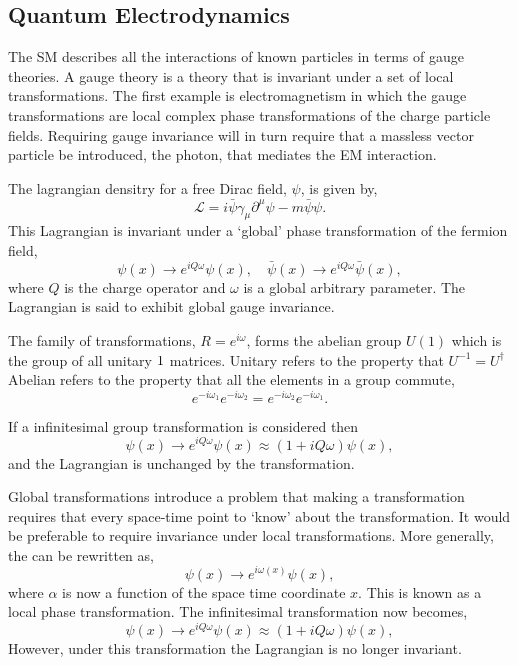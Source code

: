 \subsection{Quantum Electrodynamics}
\label{sec:QED}

The \ac{SM} describes all the interactions of known particles in terms of gauge
theories. A gauge theory is a theory that is invariant under a set of local
transformations. The first example is electromagnetism in which the gauge
transformations are local complex phase transformations of the charge particle
fields. Requiring gauge invariance will in turn require that a massless vector
particle be introduced, the photon, that mediates the \ac{EM} interaction.

The lagrangian densitry for a free Dirac field, $\psi$, is given by,
\begin{equation}
\mathcal{L} = i \bar{\psi} \gamma_{\mu} \partial^{\mu} \psi - m \bar{\psi}\psi .
\end{equation}
This Lagrangian is invariant under a `global' phase transformation of the
fermion field,
\begin{equation}
\psi(x) \to e^{iQ\omega} \psi(x), \quad \bar{\psi}(x) \to e^{iQ\omega}\bar{\psi}(x),
\label{eq:global}
\end{equation}
where $Q$ is the charge operator and $\omega$ is a global arbitrary parameter. 
The Lagrangian is said to exhibit global gauge invariance. 

The family of transformations, $R = e^{i \omega}$, forms the
abelian group $U(1)$ which is the group of all unitary $1\time1$ matrices.
Unitary refers to the property that $U^{-1} = {U}^{\dagger}$
Abelian refers to the property that all the elements in a
group commute, 
\begin{equation}
e^{-i\omega_1} 
e^{-i\omega_2} 
=
e^{-i\omega_2} 
e^{-i\omega_1} .
\end{equation}

If a infinitesimal group transformation is considered then 
\begin{equation}
\psi(x) 
\to e^{iQ\omega} \psi(x)
\approx (1+iQ\omega)\psi(x),
\end{equation}
and the Lagrangian is unchanged by the transformation.

Global transformations introduce a problem that making a transformation requires
that every space-time point to `know' about the transformation. It would be
preferable to require invariance under local transformations.
More generally, the  can be rewritten as,
\begin{equation}
\psi(x) \to e^{i\omega(x)} \psi(x),
\label{eq:local}
\end{equation}
where $\alpha$ is now a function of the space time coordinate $x$. This is known
as a local phase transformation. The infinitesimal transformation now becomes,
\begin{equation}
\psi(x) 
\to e^{iQ\omega} \psi(x)
\approx (1+iQ\omega)\psi(x),
\end{equation}
However, under this transformation the
Lagrangian is no longer invariant. 

